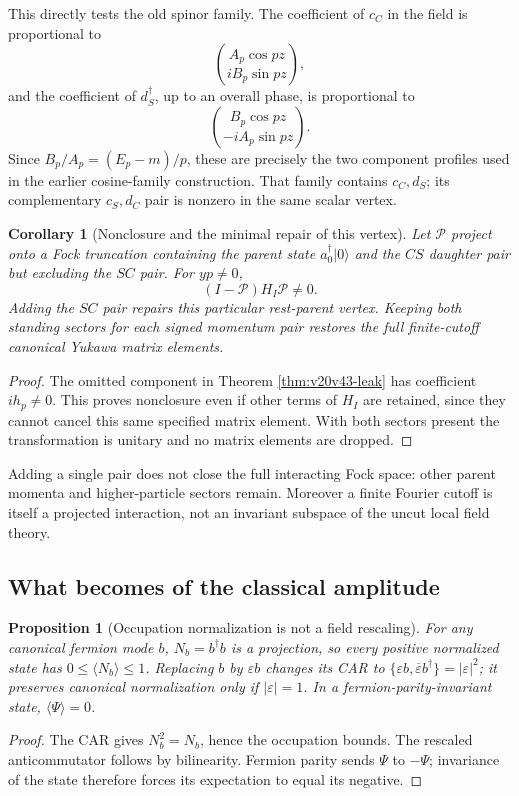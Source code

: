 \documentclass[11pt]{article}
\newtheorem{proposition}[theorem]{Proposition}
\newtheorem{corollary}[theorem]{Corollary}
\theoremstyle{remark}
\begin{document}
This directly tests the old spinor family.  The coefficient of \(c_C\)
in the field is proportional to
\[
 \binom{A_p\cos pz}{iB_p\sin pz},
\]
and the coefficient of \(d_S^\dagger\), up to an overall phase, is
proportional to
\[
 \binom{B_p\cos pz}{-iA_p\sin pz}.
\]
Since \(B_p/A_p=(E_p-m)/p\), these are precisely the two
component profiles used in the earlier cosine-family construction.
That family contains \(c_C,d_S\); its complementary \(c_S,d_C\)
pair is nonzero in the same scalar vertex.

\begin{corollary}[Nonclosure and the minimal repair of this vertex]
\label{cor:v20v43-nonclosure}
Let \(\mathcal P\) project onto a Fock truncation containing the parent
state \(a_0^\dagger|0\rangle\) and the \(CS\) daughter pair but excluding
the \(SC\) pair.  For \(yp\neq0\),
\[
 (I-\mathcal P)H_I\mathcal P\neq0.
\]
Adding the \(SC\) pair repairs this particular rest-parent vertex.
Keeping both standing sectors for each signed momentum pair restores
the full finite-cutoff canonical Yukawa matrix elements.
\end{corollary}
\begin{proof}
The omitted component in Theorem \ref{thm:v20v43-leak} has coefficient
\(ih_p\neq0\).  This proves nonclosure even if other terms of \(H_I\)
are retained, since they cannot cancel this same specified matrix
element.  With both sectors present the transformation is unitary
and no matrix elements are dropped.
\end{proof}

Adding a single pair does not close the full interacting Fock space:
other parent momenta and higher-particle sectors remain.  Moreover
a finite Fourier cutoff is itself a projected interaction, not an
invariant subspace of the uncut local field theory.

\subsection{What becomes of the classical amplitude}

\begin{proposition}[Occupation normalization is not a field rescaling]
\label{prop:v20v43-epsilon}
For any canonical fermion mode \(b\), \(N_b=b^\dagger b\) is a projection,
so every positive normalized state has
\(0\leq\langle N_b\rangle\leq1\).  Replacing \(b\) by
\(\varepsilon b\) changes its CAR to
\(\{\varepsilon b,\overline\varepsilon b^\dagger\}=|\varepsilon|^2\);
it preserves canonical normalization only if \(|\varepsilon|=1\).
In a fermion-parity-invariant state, \(\langle\Psi\rangle=0\).
\end{proposition}
\begin{proof}
The CAR gives \(N_b^2=N_b\), hence the occupation bounds.
The rescaled anticommutator follows by bilinearity.
Fermion parity sends \(\Psi\) to \(-\Psi\); invariance of the state
therefore forces its expectation to equal its negative.
\end{proof}
\end{document}
